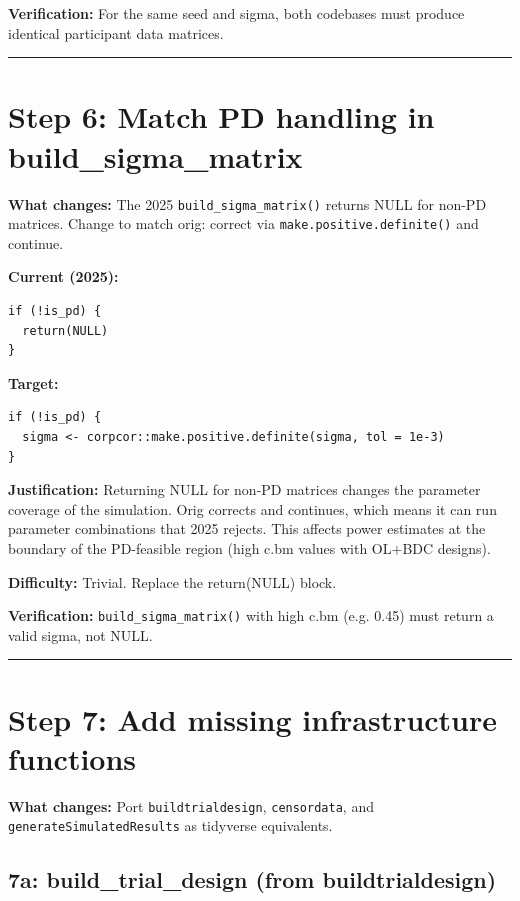 \documentclass[11pt]{article}
\begin{document}
\textbf{Verification:} For the same seed and sigma, both codebases
must produce identical participant data matrices.

\bigskip\noindent\rule{\textwidth}{0.4pt}\bigskip

\section{Step 6: Match PD handling in build\_sigma\_matrix}

\textbf{What changes:} The 2025 \texttt{build\_sigma\_matrix()} returns NULL
for non-PD matrices. Change to match orig: correct via
\texttt{make.positive.definite()} and continue.

\textbf{Current (2025):}
\begin{lstlisting}
if (!is_pd) {
  return(NULL)
}
\end{lstlisting}

\textbf{Target:}
\begin{lstlisting}
if (!is_pd) {
  sigma <- corpcor::make.positive.definite(sigma, tol = 1e-3)
}
\end{lstlisting}

\textbf{Justification:} Returning NULL for non-PD matrices changes the
parameter coverage of the simulation. Orig corrects and continues,
which means it can run parameter combinations that 2025 rejects.
This affects power estimates at the boundary of the PD-feasible
region (high c.bm values with OL+BDC designs).

\textbf{Difficulty:} Trivial. Replace the return(NULL) block.

\textbf{Verification:} \texttt{build\_sigma\_matrix()} with high c.bm (e.g. 0.45)
must return a valid sigma, not NULL.

\bigskip\noindent\rule{\textwidth}{0.4pt}\bigskip

\section{Step 7: Add missing infrastructure functions}

\textbf{What changes:} Port \texttt{buildtrialdesign}, \texttt{censordata}, and
\texttt{generateSimulatedResults} as tidyverse equivalents.

\subsection{7a: build\_trial\_design (from buildtrialdesign)}
\end{document}
